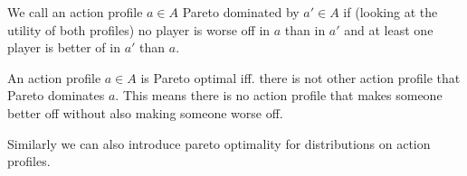 \documentclass[12pt]{article}
\theoremstyle{definition}
\theoremstyle{remark}
\begin{document}
\begin{definition}
	We call an action profile $a\in A$ Pareto dominated by $a'\in A$ if (looking at the utility of both profiles) no player is worse off in $a$ than in $a'$ and at least one player is better of in $a'$ than $a$.
\end{definition}

\begin{definition}
	An action profile $a\in A$ is Pareto optimal iff. there is not other action profile that Pareto dominates $a$. This means there is no action profile that makes someone better off without also making someone worse off.
\end{definition}

Similarly we can also introduce pareto optimality for distributions on action profiles.

\begin{definition}
	
\end{definition}
\end{document}
